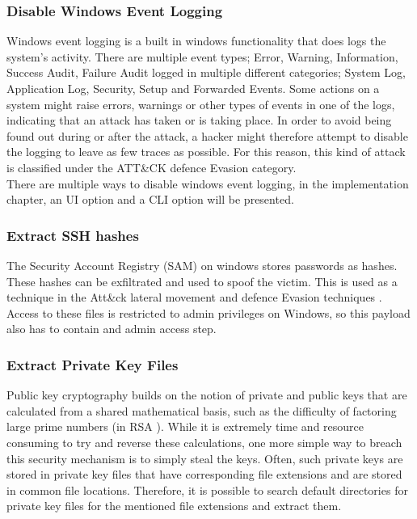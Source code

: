 \subsubsection{Disable Windows Event Logging}

Windows event logging is a built in windows functionality that does logs the system's activity. There are multiple event types; Error, Warning, Information, Success Audit, Failure Audit logged in multiple different categories; System Log, Application Log, Security, Setup and Forwarded Events. 
Some actions on a system might raise errors, warnings or other types of events in one of the logs, indicating that an attack has taken or is taking place. In order to avoid being found out during or after the attack, a hacker might therefore attempt to disable the logging to leave as few traces as possible. For this reason, this kind of attack is classified under the ATT\&CK defence Evasion category. \\
There are multiple ways to disable windows event logging, in the implementation chapter, an UI option and a CLI option will be presented. 


\subsubsection{Extract SSH hashes}

The Security Account Registry (SAM) on windows stores passwords as hashes. These hashes can be exfiltrated and used to spoof the victim. This is used as a technique in the Att\&ck lateral movement and defence Evasion techniques \cite{UseAlternateAuthentication}. \\
Access to these files is restricted to admin privileges on Windows, so this payload also has to contain and admin access step.

\subsubsection{Extract Private Key Files}

Public key cryptography builds on the notion of private and public keys that are calculated from a shared mathematical basis, such as the difficulty of factoring large prime numbers (in RSA \cite{rivestMethodObtainingDigital1978}). While it is extremely time and resource consuming to try and reverse these calculations, one more simple way to breach this security mechanism is to simply steal the keys. Often, such private keys are stored in private key files that have corresponding file extensions and are stored in common file locations. Therefore, it is possible to search default directories for private key files for the mentioned file extensions and extract them.    


